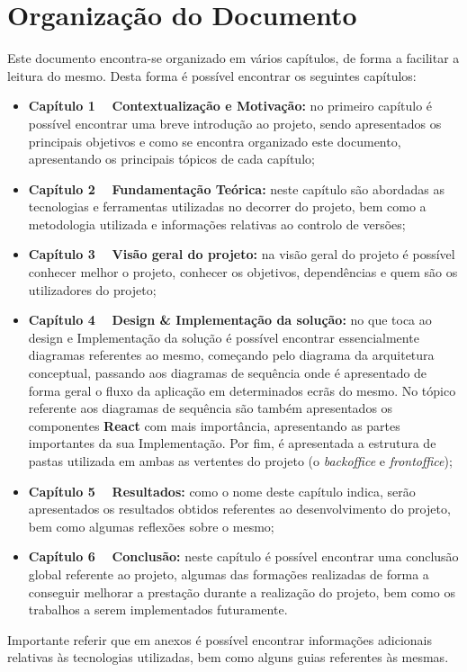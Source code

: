 \section{Organização do Documento}

Este documento encontra-se organizado em vários capítulos, de forma a facilitar a leitura do mesmo. Desta forma é possível encontrar os seguintes capítulos:

\begin{itemize}
	\item \textbf{Capítulo 1 \textemdash~ Contextualização e Motivação:} no primeiro capítulo é possível encontrar uma breve introdução ao projeto, sendo apresentados os principais objetivos e como se encontra organizado este documento, apresentando os principais tópicos de cada capítulo;

	\item \textbf{Capítulo 2 \textemdash~ Fundamentação Teórica:} neste capítulo são abordadas as tecnologias e ferramentas utilizadas no decorrer do projeto, bem como a metodologia utilizada e informações relativas ao controlo de versões;

	\item \textbf{Capítulo 3 \textemdash~ Visão geral do projeto:} na visão geral do projeto é possível conhecer melhor o projeto, conhecer os objetivos, dependências e quem são os utilizadores do projeto;

	\item \textbf{Capítulo 4 \textemdash~ Design \& Implementação da solução:} no que toca ao design e Implementação da solução é possível encontrar essencialmente diagramas referentes ao mesmo, começando pelo diagrama da arquitetura conceptual, passando aos diagramas de sequência onde é apresentado de forma geral o fluxo da aplicação em determinados ecrãs do mesmo. No tópico referente aos diagramas de sequência são também apresentados os componentes \textbf{React} com mais importância, apresentando as partes importantes da sua Implementação. Por fim, é apresentada a estrutura de pastas utilizada em ambas as vertentes do projeto (o \textit{backoffice} e \textit{frontoffice});

	\item \textbf{Capítulo 5 \textemdash~ Resultados:} como o nome deste capítulo indica, serão apresentados os resultados obtidos referentes ao desenvolvimento do projeto, bem como algumas reflexões sobre o mesmo;

	\item  \textbf{Capítulo 6 \textemdash~ Conclusão:} neste capítulo é possível encontrar uma conclusão global referente ao projeto, algumas das formações realizadas de forma a conseguir melhorar a prestação durante a realização do projeto, bem como os trabalhos a serem implementados futuramente.
\end{itemize}

Importante referir que em anexos é possível encontrar informações adicionais relativas às tecnologias utilizadas, bem como alguns guias referentes às mesmas.